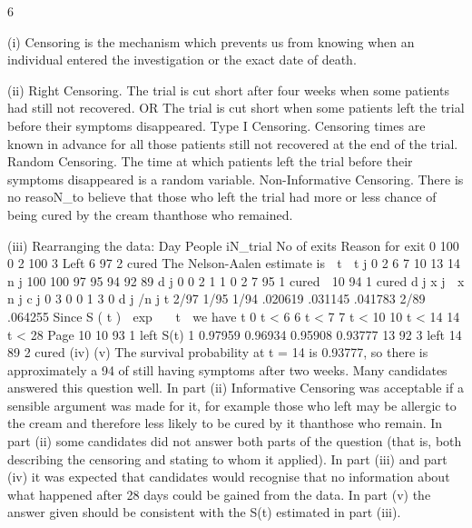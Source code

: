 6
\item (i) Censoring is the mechanism which prevents us from knowing when an individual
entered the investigation or the exact date of death.
\item (ii) Right Censoring. The trial is cut short after four weeks when some patients had still
not recovered.
OR
The trial is cut short when some patients left the trial before their symptoms
disappeared.
Type I Censoring. Censoring times are known in advance for all those patients still
not recovered at the end of the trial.
Random Censoring. The time at which patients left the trial before their symptoms
disappeared is a random variable.
Non-Informative Censoring. There is no reasoN_to believe that those who left the trial
had more or less chance of being cured by the cream thanthose who remained.
\item (iii)
Rearranging the data:
Day
People iN_trial
No of exits
Reason for exit
0
100
0
2
100
3
Left
6
97
2
cured
The Nelson-Aalen estimate is  t 
t j
0
2
6
7
10
13
14
n j
100
100
97
95
94
92
89
d j
0
0
2
1
1
0
2
7
95
1
cured

10
94
1
cured
d j
x j  x
n j
c j
0
3
0
0
1
3
0
d j /n j \lambda t
2/97
1/95
1/94 .020619
.031145
.041783
2/89 .064255
Since S ( t )  exp   t  we have
t
0 \leq t < 6
6 \leq t < 7
7 \leq t < 10
10 \leq t < 14
14 \leq t < 28
Page 10
10
93
1
left
S(t)
1
0.97959
0.96934
0.95908
0.93777
13
92
3
left
14
89
2
cured%
(iv)
(v)
The survival probability at t = 14 is 0.93777, so there is approximately a 94%
of still having symptoms after two weeks.
Many candidates answered this question well. In part (ii) Informative Censoring was
acceptable if a sensible argument was made for it, for example those who left may be allergic
to the cream and therefore less likely to be cured by it thanthose who remain. In part (ii)
some candidates did not answer both parts of the question (that is, both describing the
censoring and stating to whom it applied). In part (iii) and part (iv) it was expected that
candidates would recognise that no information about what happened after 28 days could be
gained from the data. In part (v) the answer given should be consistent with the S(t) estimated
in part (iii).

